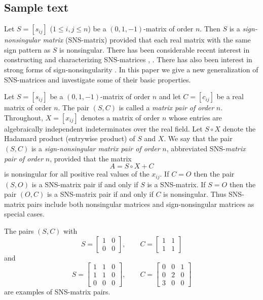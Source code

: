 \subsection{Sample text}
Let $S=[s_{ij}]$ ($1\leq i,j\leq n$) be a $(0,1,-1)$-matrix
of order $n$. Then $S$ is a {\em sign-nonsingular matrix}
(SNS-matrix) provided that each real matrix with the same
sign pattern as $S$ is nonsingular. There has been
considerable recent interest in constructing and
characterizing SNS-matrices \cite{Healey.etal-2004}, \cite{Dai.etal-2007}. There
has also been interest in strong forms of
sign-nonsingularity \cite{Balikai.etal-2008}. In this paper we give a new
generalization of SNS-matrices and investigate some of
their basic properties.


Let $S=[s_{ij}]$ be a $(0,1,-1)$-matrix of order $n$ and
let $C=[c_{ij}]$ be a real matrix of order $n$. The pair
$(S,C)$ is called a {\em matrix pair of order} $n$.
Throughout, $X=[x_{ij}]$ denotes a matrix of order $n$
whose entries are algebraically independent indeterminates
over the real field. Let $S\circ X$ denote the Hadamard
product (entrywise product) of $S$ and $X$. We say that the
pair $(S,C)$ is a {\em sign-nonsingular matrix pair of
order} $n$, abbreviated SNS-{\em matrix pair of order} $n$,
provided that the matrix \[A=S\circ X+C\] is nonsingular
for all positive real values of the $x_{ij}$.  If $C=O$
then the pair $(S,O)$ is a SNS-matrix pair if and only if
$S$ is a SNS-matrix.  If $S=O$ then the pair $(O,C)$ is a
SNS-matrix pair if and only if $C$ is nonsingular. Thus
SNS-matrix pairs include both nonsingular matrices and
sign-nonsingular matrices as special cases.

The pairs $(S,C)$ with
\[S=\left[\begin{array}{cc}1&0\\0&0\end{array}\right],\qquad 
C=\left[\begin{array}{cc}1&1\\1&1\end{array}\right]\] and 
\[S=\left[\begin{array}{ccc}1&1&0\\1&1&0\\0&0&0\end{array}\right],\qquad 
C=\left[\begin{array}{ccc}0&0&1\\0&2&0\\
3&0&0\end{array}\right]\] are examples of SNS-matrix pairs.


